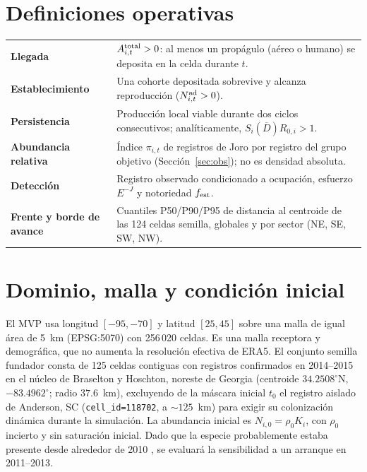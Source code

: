 \documentclass[11pt,letterpaper]{article}
\begin{document}
\section{Definiciones operativas}
\begin{center}\small
\begin{tabularx}{\textwidth}{@{}>{\bfseries}p{3.0cm}Y@{}}\toprule
Llegada & $A^{\rm total}_{i,t}>0$: al menos un propágulo (aéreo o humano) se deposita en la celda durante $t$.\\
Establecimiento & Una cohorte depositada sobrevive y alcanza reproducción ($N^{\rm ad}_{i,t}>0$).\\
Persistencia & Producción local viable durante dos ciclos consecutivos; analíticamente, $S_i(\overline D)R_{0,i}>1$.\\
Abundancia relativa & Índice $\pi_{i,t}$ de registros de Joro por registro del grupo objetivo (Sección~\ref{sec:obs}); no es densidad absoluta.\\
Detección & Registro observado condicionado a ocupación, esfuerzo $E^{-J}$ y notoriedad $f_{\rm est}$.\\
Frente y borde de avance & Cuantiles P50/P90/P95 de distancia al centroide de las 124 celdas semilla, globales y por sector (NE, SE, SW, NW).\\
\bottomrule\end{tabularx}\end{center}

\section{Dominio, malla y condición inicial}
El MVP usa longitud $[-95,-70]$ y latitud $[25,45]$ sobre una malla de igual área de 5~km (EPSG:5070) con 256\,020 celdas. Es una malla receptora y demográfica, que no aumenta la resolución efectiva de ERA5. El conjunto semilla fundador consta de 125 celdas contiguas con registros confirmados en 2014--2015 en el núcleo de Braselton y Hoschton, noreste de Georgia (centroide $34.2508^\circ$N, $-83.4962^\circ$; radio $37.6$~km), excluyendo de la máscara inicial $t_0$ el registro aislado de Anderson, SC (\texttt{cell\_id=118702}, a $\sim 125$~km) para exigir su colonización dinámica durante la simulación. La abundancia inicial es $N_{i,0}=\rho_0K_i$, con $\rho_0$ incierto y sin saturación inicial. Dado que la especie probablemente estaba presente desde alrededor de 2010 \cite{nelsen2023,hoebeke2015}, se evaluará la sensibilidad a un arranque en 2011--2013.
\end{document}

